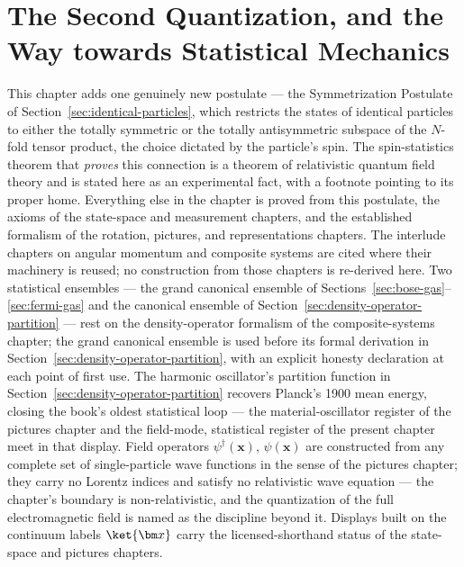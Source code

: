\chapter{The Second Quantization, and the Way towards Statistical Mechanics}

\begin{note}
    This chapter adds one genuinely new postulate --- the Symmetrization Postulate of Section~\ref{sec:identical-particles}, which restricts the states of identical particles to either the totally symmetric or the totally antisymmetric subspace of the $N$-fold tensor product, the choice dictated by the particle's spin. The spin-statistics theorem that \emph{proves} this connection is a theorem of relativistic quantum field theory and is stated here as an experimental fact, with a footnote pointing to its proper home. Everything else in the chapter is proved from this postulate, the axioms of the state-space and measurement chapters, and the established formalism of the rotation, pictures, and representations chapters. The interlude chapters on angular momentum and composite systems are cited where their machinery is reused; no construction from those chapters is re-derived here. Two statistical ensembles --- the grand canonical ensemble of Sections~\ref{sec:bose-gas}--\ref{sec:fermi-gas} and the canonical ensemble of Section~\ref{sec:density-operator-partition} --- rest on the density-operator formalism of the composite-systems chapter; the grand canonical ensemble is used before its formal derivation in Section~\ref{sec:density-operator-partition}, with an explicit honesty declaration at each point of first use. The harmonic oscillator's partition function in Section~\ref{sec:density-operator-partition} recovers Planck's 1900 mean energy, closing the book's oldest statistical loop --- the material-oscillator register of the pictures chapter and the field-mode, statistical register of the present chapter meet in that display. Field operators $\psi^\dagger(\bm x)$, $\psi(\bm x)$ are constructed from any complete set of single-particle wave functions in the sense of the pictures chapter; they carry no Lorentz indices and satisfy no relativistic wave equation --- the chapter's boundary is non-relativistic, and the quantization of the full electromagnetic field is named as the discipline beyond it. Displays built on the continuum labels $\ket{\bm x}$ carry the licensed-shorthand status of the state-space and pictures chapters.
\end{note}

